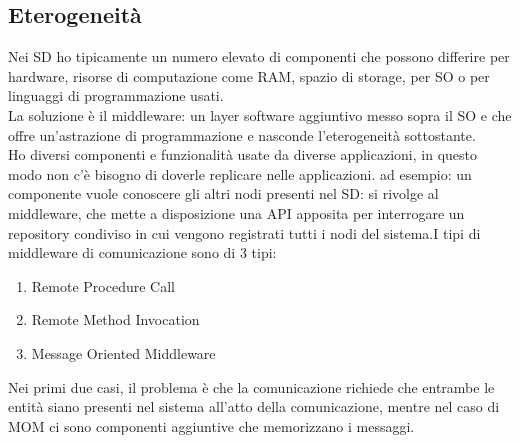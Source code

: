 \documentclass[16px]{article}
\begin{document}
\subsection{Eterogeneità}
Nei SD ho tipicamente un numero elevato di componenti che possono differire per hardware, risorse di computazione come RAM, spazio di storage, per SO o per linguaggi di programmazione usati.\\La soluzione è il middleware: un layer software aggiuntivo messo sopra il SO e che offre un'astrazione di programmazione e nasconde l'eterogeneità sottostante.\\Ho diversi componenti e funzionalità usate da diverse applicazioni, in questo modo non c'è bisogno di doverle replicare nelle applicazioni.
ad esempio: un componente vuole conoscere gli altri nodi presenti nel SD: si rivolge al middleware, che mette a disposizione una API apposita per interrogare un repository condiviso in cui vengono registrati tutti i nodi del sistema.I tipi di middleware di comunicazione sono di 3 tipi:
\begin{enumerate}
\item Remote Procedure Call
\item Remote Method Invocation
\item Message Oriented Middleware
\end{enumerate}
Nei primi due casi, il problema è che la comunicazione richiede che entrambe le entità siano presenti nel sistema all'atto della comunicazione, mentre nel caso di MOM ci sono componenti aggiuntive che memorizzano i messaggi.
\end{document}
